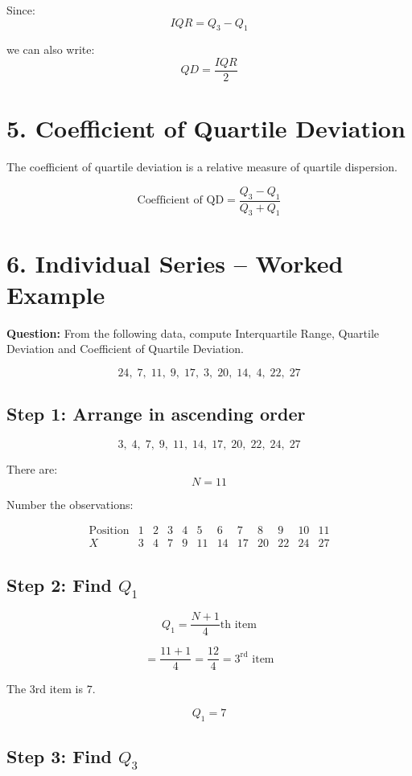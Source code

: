 \documentclass[12pt,a4paper]{article}
\newcommand{\boxformula}[1]{%
\[
\boxed{\displaystyle #1}
\]
}
\begin{document}
Since:
\[
IQR=Q_3-Q_1
\]

we can also write:
\[
\boxed{QD=\frac{IQR}{2}}
\]

\section{5. Coefficient of Quartile Deviation}

The coefficient of quartile deviation is a relative measure of quartile dispersion.

\boxformula{
\text{Coefficient of QD}
=
\frac{Q_3-Q_1}{Q_3+Q_1}
}

\section{6. Individual Series -- Worked Example}

\textbf{Question:} From the following data, compute Interquartile Range,
Quartile Deviation and Coefficient of Quartile Deviation.

\[
24,\;7,\;11,\;9,\;17,\;3,\;20,\;14,\;4,\;22,\;27
\]

\subsection*{Step 1: Arrange in ascending order}

\[
3,\;4,\;7,\;9,\;11,\;14,\;17,\;20,\;22,\;24,\;27
\]

There are:
\[
N=11
\]

Number the observations:

\[
\begin{array}{c|ccccccccccc}
\text{Position}
&1&2&3&4&5&6&7&8&9&10&11\\
\hline
X
&3&4&7&9&11&14&17&20&22&24&27
\end{array}
\]

\subsection*{Step 2: Find $Q_1$}

\[
Q_1=\frac{N+1}{4}\text{th item}
\]

\[
=\frac{11+1}{4}
=\frac{12}{4}
=3^{\text{rd}}\text{ item}
\]

The 3rd item is $7$.

\[
\boxed{Q_1=7}
\]

\subsection*{Step 3: Find $Q_3$}
\end{document}

